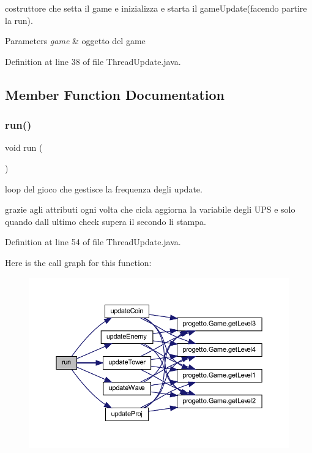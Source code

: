 costruttore che setta il game e inizializza e starta il game\+Update(facendo partire la run). 


\begin{DoxyParams}{Parameters}
{\em game} & oggetto del game \\
\hline
\end{DoxyParams}


Definition at line 38 of file Thread\+Update.\+java.



\subsection{Member Function Documentation}
\mbox{\label{classprogetto_1_1_thread_update_a13a43e6d814de94978c515cb084873b1}} 
\subsubsection{\texorpdfstring{run()}{run()}}
{\footnotesize\ttfamily void run (\begin{DoxyParamCaption}{ }\end{DoxyParamCaption})}



loop del gioco che gestisce la frequenza degli update. 

grazie agli attributi ogni volta che cicla aggiorna la variabile degli U\+PS e solo quando dall ultimo check supera il secondo li stampa. 

Definition at line 54 of file Thread\+Update.\+java.

Here is the call graph for this function\+:\nopagebreak
\begin{figure}[H]
\begin{center}
\leavevmode
\includegraphics[width=350pt]{classprogetto_1_1_thread_update_a13a43e6d814de94978c515cb084873b1_cgraph}
\end{center}
\end{figure}
\mbox{\label{classprogetto_1_1_thread_update_a7ca93fcd8c7440e7b3f64c595a5be28c}} 

